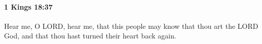 
		\paragraph{1 Kings 18:37} %
			\label{1KINGS-18-37}

			Hear me, O LORD, hear me, that this people may know that thou art the LORD God, and that thou hast turned their heart back again.


